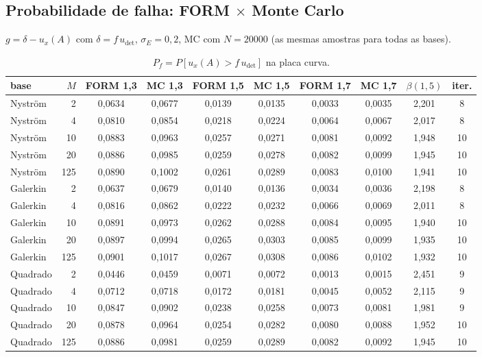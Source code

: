 \documentclass[11pt,a4paper]{article}
\begin{document}
\subsection{Probabilidade de falha: FORM $\times$ Monte Carlo}
$g=\delta-u_x(A)$ com $\delta=f\,u_{\det}$, $\sigma_E=0{,}2$, MC com $N=20000$ (as mesmas amostras para todas as bases).
\begin{table}[H]
\centering
\small
\begin{tabular}{lrcccccccc}
\toprule
base & $M$ & FORM 1,3 & MC 1,3 & FORM 1,5 & MC 1,5 & FORM 1,7 & MC 1,7 & $\beta(1{,}5)$ & iter.\\
\midrule
Nyström & 2 & 0,0634 & 0,0677 & 0,0139 & 0,0135 & 0,0033 & 0,0035 & 2,201 & 8\\
Nyström & 4 & 0,0810 & 0,0854 & 0,0218 & 0,0224 & 0,0064 & 0,0067 & 2,017 & 8\\
Nyström & 10 & 0,0883 & 0,0963 & 0,0257 & 0,0271 & 0,0081 & 0,0092 & 1,948 & 10\\
Nyström & 20 & 0,0886 & 0,0985 & 0,0259 & 0,0278 & 0,0082 & 0,0099 & 1,945 & 10\\
Nyström & 125 & 0,0890 & 0,1002 & 0,0261 & 0,0289 & 0,0083 & 0,0100 & 1,941 & 10\\
\midrule
Galerkin & 2 & 0,0637 & 0,0679 & 0,0140 & 0,0136 & 0,0034 & 0,0036 & 2,198 & 8\\
Galerkin & 4 & 0,0816 & 0,0862 & 0,0222 & 0,0232 & 0,0066 & 0,0069 & 2,011 & 8\\
Galerkin & 10 & 0,0891 & 0,0973 & 0,0262 & 0,0288 & 0,0084 & 0,0095 & 1,940 & 10\\
Galerkin & 20 & 0,0897 & 0,0994 & 0,0265 & 0,0303 & 0,0085 & 0,0099 & 1,935 & 10\\
Galerkin & 125 & 0,0901 & 0,1017 & 0,0267 & 0,0308 & 0,0086 & 0,0102 & 1,932 & 10\\
\midrule
Quadrado & 2 & 0,0446 & 0,0459 & 0,0071 & 0,0072 & 0,0013 & 0,0015 & 2,451 & 9\\
Quadrado & 4 & 0,0712 & 0,0718 & 0,0172 & 0,0181 & 0,0045 & 0,0052 & 2,115 & 9\\
Quadrado & 10 & 0,0847 & 0,0902 & 0,0238 & 0,0258 & 0,0073 & 0,0081 & 1,981 & 9\\
Quadrado & 20 & 0,0878 & 0,0964 & 0,0254 & 0,0282 & 0,0080 & 0,0088 & 1,952 & 10\\
Quadrado & 125 & 0,0886 & 0,0981 & 0,0259 & 0,0289 & 0,0082 & 0,0092 & 1,945 & 10\\
\bottomrule
\end{tabular}
\caption{$P_f=P[u_x(A)>f\,u_{\det}]$ na placa curva.}
\label{tab:pfc}
\end{table}
\end{document}
